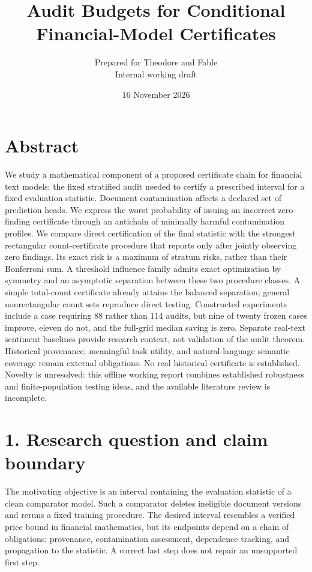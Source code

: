 \documentclass[11pt]{article}
\title{Audit Budgets for Conditional Financial-Model Certificates}
\author{Prepared for Theodore and Fable\\Internal working draft}
\date{16 November 2026}
\begin{document}
\maketitle

\section*{Abstract}

We study a mathematical component of a proposed certificate chain for financial text models: the fixed stratified audit needed to certify a prescribed interval for a fixed evaluation statistic. Document contamination affects a declared set of prediction heads. We express the worst probability of issuing an incorrect zero-finding certificate through an antichain of minimally harmful contamination profiles. We compare direct certification of the final statistic with the strongest rectangular count-certificate procedure that reports only after jointly observing zero findings. Its exact risk is a maximum of stratum risks, rather than their Bonferroni sum. A threshold influence family admits exact optimization by symmetry and an asymptotic separation between these two procedure classes. A simple total-count certificate already attains the balanced separation; general nonrectangular count sets reproduce direct testing. Constructed experiments include a case requiring 88 rather than 114 audits, but nine of twenty frozen cases improve, eleven do not, and the full-grid median saving is zero. Separate real-text sentiment baselines provide research context, not validation of the audit theorem. Historical provenance, meaningful task utility, and natural-language semantic coverage remain external obligations. No real historical certificate is established. Novelty is unresolved: this offline working report combines established robustness and finite-population testing ideas, and the available literature review is incomplete.

\section*{1. Research question and claim boundary}

The motivating objective is an interval containing the evaluation statistic of a clean comparator model. Such a comparator deletes ineligible document versions and reruns a fixed training procedure. The desired interval resembles a verified price bound in financial mathematics, but its endpoints depend on a chain of obligations: provenance, contamination assessment, dependence tracking, and propagation to the statistic. A correct last step does not repair an unsupported first step.
\end{document}
